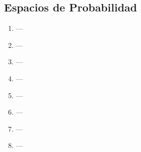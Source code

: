 \subsection{Espacios de Probabilidad}

\begin{enumerate}
\item  ---
\item  ---
\item  ---
\item  ---
\item  ---
\item  ---
\item  ---
\item  ---

\end{enumerate}
